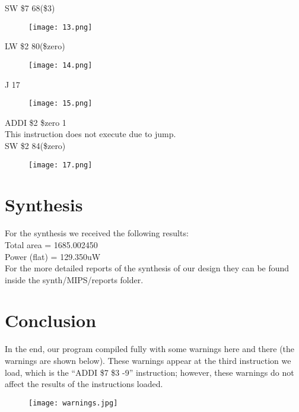 \documentclass[paper=letter, fontsize=11pt]{scrartcl} %
\numberwithin{equation}{section}
\numberwithin{figure}{section}
\numberwithin{table}{section}
\begin{document}
SW \$7 68(\$3)		
\begin{figure}[H]
	\centering
		\texttt{[image: 13.png]}
	\label{fig:tests}
\end{figure}
\pagebreak
LW \$2 80(\$zero)
\begin{figure}[H]
	\centering
		\texttt{[image: 14.png]}
	\label{fig:tests}
\end{figure}

J 17										
\begin{figure}[H]
	\centering
		\texttt{[image: 15.png]}
	\label{fig:tests}
\end{figure}
\pagebreak
ADDI \$2 \$zero 1 \\
This instruction does not execute due to jump.
\\

SW \$2 84(\$zero)
\begin{figure}[H]
	\centering
		\texttt{[image: 17.png]}
	\label{fig:tests}
\end{figure}

\pagebreak


\section{Synthesis}
For the synthesis we received the following results:
\\
Total area = 1685.002450
\\
Power (flat) = 129.350uW
\\
For the more detailed reports of the synthesis of our design they can be found inside the synth/MIPS/reports folder.
\\
\pagebreak

\section{Conclusion}
In the end, our program compiled fully with some warnings here and there (the warnings are shown below). These warnings appear at the third instruction we load, which is the ``ADDI \$7 \$3 -9'' instruction; however, these warnings do not affect the results of the instructions loaded.

\begin{figure}
	\centering
		\texttt{[image: warnings.jpg]}
	\label{fig:warnings}
\end{figure}
\end{document}
